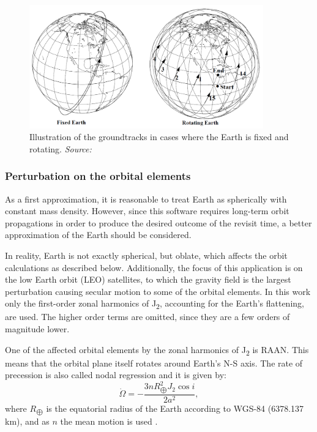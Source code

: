 \begin{figure}
\centering
\includegraphics[width=0.9\textwidth]{Images/groundtrack-fixed-rotating.png}\caption{Illustration of the groundtracks in cases where the Earth is fixed and rotating. \textit{Source: \cite{Vallado}}}
\label{groundtrack-fixed-rotating} 
\end{figure}


\bigskip
\subsubsection{Perturbation on the orbital elements}
\bigskip

As a first approximation, it is reasonable to treat Earth as spherically with constant mass density. However, since this software requires long-term orbit propagations in order to produce the desired outcome of the revisit time, a better approximation of the Earth should be considered.

In reality, Earth is not exactly spherical, but oblate, which affects the orbit calculations as described below. 
Additionally, the focus of this application is on the low Earth orbit (LEO) satellites, to which the gravity field is the largest perturbation causing secular motion to some of the orbital elements. In this work only the first-order zonal harmonics of J\textsubscript{2}, accounting for the Earth's flattening, are used. The higher order terms are omitted, since they are a few orders of magnitude lower.

One of the affected orbital elements by the zonal harmonics of J\textsubscript{2} is RAAN. This means that the orbital plane itself rotates around Earth's N-S axis. The rate of precession is also called nodal regression and it is given by:
\begin{equation}
\dot{\Omega} = - \frac{3 n R_{\bigoplus}^{2} J_{2} \cos{i}}{2 a^{2}},
\end{equation}
where $R_{\bigoplus}$ is the equatorial radius of the Earth according to WGS-84 (6378.137 km), and as $n$ the mean motion is used \cite{Montenbruck}.

